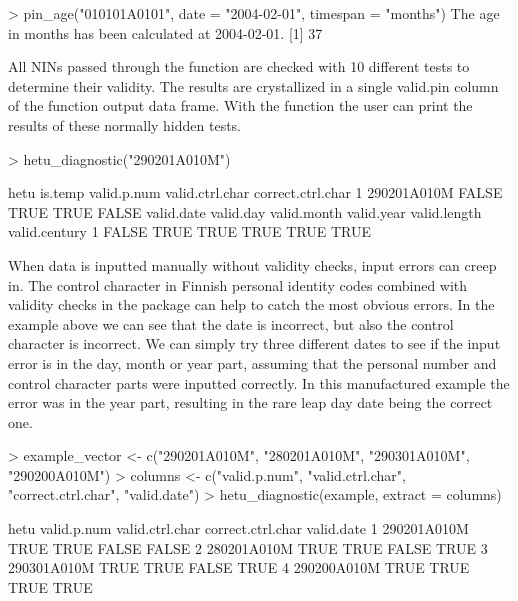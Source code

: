 \begin{example}
  > pin_age("010101A0101", date = "2004-02-01", timespan = "months")
  The age in months has been calculated at 2004-02-01.
  [1] 37
\end{example}

All NINs passed through the  function are checked with 10 different tests to determine their validity. The results are crystallized in a single valid.pin column of the  function output data frame. With the  function the user can print the results of these normally hidden tests.

\begin{example}
  > hetu_diagnostic("290201A010M")
  
           hetu is.temp valid.p.num valid.ctrl.char correct.ctrl.char
  1 290201A010M   FALSE        TRUE            TRUE             FALSE
    valid.date valid.day valid.month valid.year valid.length valid.century
  1      FALSE      TRUE        TRUE       TRUE         TRUE          TRUE
\end{example}

When data is inputted manually without validity checks, input errors can creep in. The control character in Finnish personal identity codes combined with validity checks in the  package can help to catch the most obvious errors. In the example above we can see that the date is incorrect, but also the control character is incorrect. We can simply try three different dates to see if the input error is in the day, month or year part, assuming that the personal number and control character parts were inputted correctly. In this manufactured example the error was in the year part, resulting in the rare leap day date being the correct one.

\begin{example}
  > example_vector <- c("290201A010M", "280201A010M", "290301A010M", "290200A010M")
  > columns <- c("valid.p.num", "valid.ctrl.char", "correct.ctrl.char", "valid.date")
  > hetu_diagnostic(example, extract = columns)
  
           hetu valid.p.num valid.ctrl.char correct.ctrl.char valid.date
  1 290201A010M        TRUE            TRUE             FALSE      FALSE
  2 280201A010M        TRUE            TRUE             FALSE       TRUE
  3 290301A010M        TRUE            TRUE             FALSE       TRUE
  4 290200A010M        TRUE            TRUE              TRUE       TRUE
\end{example}

